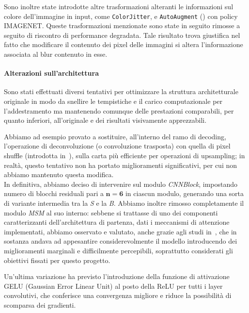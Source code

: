 \documentclass[a4paper,10pt,twocolumn]{article}
\begin{document}
Sono inoltre state introdotte altre trasformazioni alteranti le informazioni sul colore dell'immagine in input, come \texttt{ColorJitter},
e \texttt{AutoAugment} (\cite{cubuk2019autoaugmentlearningaugmentationpolicies}) con policy IMAGENET. Queste trasformazioni menzionate sono state in seguito rimosse a seguito di riscontro di performance degradata.
Tale risultato trova giustifica nel fatto che modificare il contenuto dei pixel delle immagini si altera l'informazione associata al blur contenuto in esse.

\paragraph{Alterazioni sull'architettura}
Sono stati effettuati diversi tentativi per ottimizzare la struttura architetturale originale in modo da snellire le tempistiche e il carico computazionale per l'addestramento ma mantenendo comunque delle
prestazioni comparabili, per quanto inferiori, all'originale e dei risultati visivamente apprezzabili.

Abbiamo ad esempio provato a sostituire, all'interno del ramo di decoding, l'operazione di deconvoluzione (o convoluzione trasposta) con quella di pixel shuffle (introdotta in~\cite{shi2016realtimesingleimagevideo}), 
sulla carta più efficiente per operazioni di upsampling; in realtà, questo tentativo non ha portato miglioramenti significativi, per cui non abbiamo mantenuto questa modifica. \\
In definitiva, abbiamo deciso di intervenire sul modulo \textit{CNNBlock}, impostando numero di blocchi residuali pari a \(\mathbf{n=6}\) in ciascun modulo, generando una sorta di variante intermedia tra la \textit{S} 
e la \textit{B}. Abbiamo inoltre rimosso completamente il modulo \textit{MSM} al suo interno: sebbene si trattasse di uno dei componenti caratterizzanti dell'architettura di partenza, dati i meccanismi di attenzione implementati,
abbiamo osservato e valutato, anche grazie agli studi in~\cite{convir}, che in sostanza andava ad appesantire considerevolmente il modello introducendo dei miglioramenti marginali e difficilmente percepibili,
soprattutto considerati gli obiettivi fissati per questo progetto.

Un'ultima variazione ha previsto l'introduzione della funzione di attivazione GELU (Gaussian Error Linear Unit) al posto della ReLU per tutti i layer convolutivi, che conferisce una convergenza migliore e riduce la 
possibilità di scomparsa dei gradienti.
\end{document}
